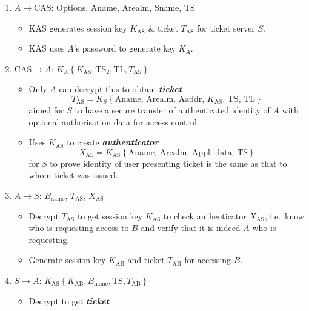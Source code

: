 \documentclass[twocolumn,landscape,10pt]{article}
\theoremstyle{definition}
\begin{document}
\begin{enumerate}
    \item $A\rightarrow \text{CAS}$: Options, Aname, Arealm, Sname, TS
        \begin{itemize}
            \item KAS generates session key $K_\text{AS}$ \& ticket
                $T_\text{AS}$ for ticket server $S$.
            \item KAS uses $A$'s password to generate key $K_A$.
        \end{itemize} 
    \item $\text{CAS}\rightarrow A$:
        $K_A\left\{K_\text{AS},\text{TS}_2,\text{TL},T_\text{AS}\right\}$
        \begin{itemize}
            \item Only $A$ can decrypt this to obtain \textbf{\emph{ticket}}
                \[
                    T_\text{AS}=K_S\left\{\text{Aname, Arealm, Aaddr,
                    $K_\text{AS}$, TS, TL}\right\}
                \]
                aimed for $S$ to have a secure transfer of authenticated
                identity of $A$ with optional authorisation data for access
                control.
            \item Uses $K_\text{AS}$ to create \textbf{\emph{authenticator}}
                \[
                    X_\text{AS}=K_\text{AS}\left\{\text{Aname, Arealm, Appl. data, TS}\right\}
                \]
                for $S$ to prove identity of user presenting ticket is the same
                as that to whom ticket was issued.
        \end{itemize} 
    \item $A\rightarrow S$: $B_\text{name}$, $T_\text{AS}$, $X_\text{AS}$
        \begin{itemize}
            \item Decrypt $T_\text{AS}$ to get session key $K_\text{AS}$
                to check authenticator $X_\text{AS}$, i.e.\ know who is
                requesting access to $B$ and verify that it is indeed $A$ who is
                requesting.
            \item Generate session key $K_\text{AB}$ and ticket $T_\text{AB}$
                for accessing $B$.
        \end{itemize} 
    \item $S\rightarrow A$:
        $K_\text{AS}\left\{K_\text{AB},B_\text{name},\text{TS},T_\text{AB}\right\}$
        \begin{itemize}
            \item Decrypt to get \textbf{\emph{ticket}}

\end{itemize}
\end{enumerate}
\end{document}
